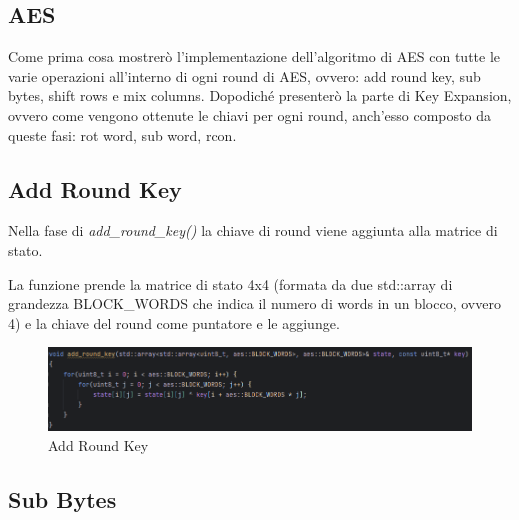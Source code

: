 \subsection{AES}

         

\textsf{\small Come prima cosa mostrerò l'implementazione dell'algoritmo di AES con tutte le varie operazioni all'interno di ogni round di AES, ovvero: add round key, sub bytes, shift rows e mix columns. Dopodiché presenterò la parte di Key Expansion, ovvero come vengono ottenute le chiavi per ogni round, anch'esso composto da queste fasi: rot word, sub word, rcon.}


\subsection{Add Round Key}

   

\textsf{\small Nella fase di \emph{add\_round\_key()} la chiave di round viene aggiunta alla matrice di stato.}

\textsf{\small La funzione prende la matrice di stato 4x4 (formata da due std::array di grandezza BLOCK\_WORDS che indica il numero di words in un blocco, ovvero 4) e la chiave del round come puntatore e le aggiunge.}

\begin{figure}[H]
	\centering
	\includegraphics[width=1\textwidth, height=1\textheight, keepaspectratio]{./images/code/cpp/encryption/add_round_key.PNG}
	\caption{Add Round Key}
	\label{fig:add_round_key}
\end{figure}

\subsection{Sub Bytes}

